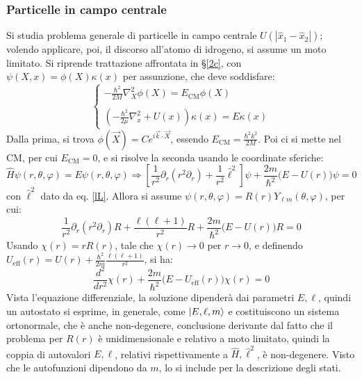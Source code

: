 \documentclass[10pt, a4paper]{scrartcl}
\numberwithin{equation}{subsection}
\theoremstyle{style2}
\theoremstyle{style1}
\begin{document}
\subsubsection{Particelle in campo centrale}
Si studia problema generale di particelle in campo centrale $U(|\hat{x}_1 - \hat{x}_2|)$; volendo applicare, poi, il discorso all'atomo di idrogeno, si assume un moto limitato. Si riprende trattazione affrontata in \S\ref{2c}, con $\psi (X,x) = \phi (X) \kappa (x)$ per assunzione, che deve soddisfare:
\begin{equation}
	\begin{cases}
		\displaystyle - \frac{\hbar ^2}{2M} \nabla^2_X \phi (X) = E_\text{CM} \phi (X)\\ 
		\\
		\displaystyle \left(- \frac{\hbar ^2}{2\mu }\nabla ^2_x + U(x)\right) \kappa (x) = E\kappa (x)
	\end{cases}
\end{equation}
Dalla prima, si trova $\phi (\vec{X}) = C e^{i\vec{k}\cdot \vec{X}} $, essendo $E_\text{CM} = \frac{\hbar ^2 k^2}{2M}$. Poi ci si mette nel CM, per cui $E_\text{CM} = 0 $, e si risolve la seconda usando le coordinate sferiche:
\begin{equation}
	\hat{H} \psi (r,\theta ,\varphi ) = E \psi (r,\theta ,\varphi ) \Rightarrow  \left[ \frac{1}{r^2} \partial _r (r^2 \partial _r) + \frac{1}{r^2}\hat{\ell }^2 \right] \psi + \frac{2m}{\hbar ^2}\Big(E - U(r)\Big) \psi  = 0
\end{equation}
con $\hat{\ell }^2$ dato da eq. \ref{lL}. Allora si assume $\psi (r,\theta ,\varphi ) = R(r) Y_{\ell m} (\theta ,\varphi )$, per cui:
\[
\frac{1}{r^2}\partial _r (r^2 \partial _r) R + \frac{\ell (\ell +1)}{r^2}R + \frac{2m}{\hbar ^2}\Big(E - U(r)\Big) R = 0
\] 
Usando $\chi (r) = r R(r)$, tale che $\chi (r) \to 0$ per $r\to 0$, e definendo $U_\text{eff}(r) = U(r) + \frac{\hbar ^2}{2m}\frac{\ell (\ell +1)}{r^2}$, si ha:
\begin{equation}
	\frac{d ^2}{d r^2} \chi (r) + \frac{2m}{\hbar ^2}\Big(E - U_\text{eff}(r)\Big) \chi (r) = 0
\end{equation}
Vista l'equazione differenziale, la soluzione dipender\`a dai parametri $E, \ell $, quindi un autostato si esprime, in generale, come $\ket{E,\ell ,m} $ e costituiscono un sistema ortonormale, che \`e anche non-degenere, conclusione derivante dal fatto che il problema per $R(r)$ \`e unidimensionale e relativo a moto limitato, quindi la coppia di autovalori $E, \ell $, relativi rispettivamente a $\hat{H}, \hat{\ell }^2$, \`e non-degenere. Visto che le autofunzioni dipendono da $m$, lo si include per la descrizione degli stati.
\end{document}
